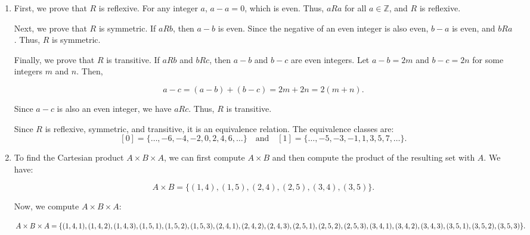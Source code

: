 \begin{enumerate}
\item
First, we prove that $R$ is reflexive. For any integer $a$, $a - a = 0$, which is even. Thus, $aRa$ for all $a \in \mathbb{Z}$, and $R$ is reflexive.

Next, we prove that $R$ is symmetric. If $aRb$, then $a - b$ is even. Since the negative of an even integer is also even, $b - a$ is even, and $bRa$. Thus, $R$ is symmetric.


Finally, we prove that $R$ is transitive. If $aRb$ and $bRc$, then $a - b$ and $b - c$ are even integers. Let $a - b = 2m$ and $b - c = 2n$ for some integers $m$ and $n$. Then,

\[
a - c = (a - b) + (b - c) = 2m + 2n = 2(m + n).
\]

Since $a - c$ is also an even integer, we have $aRc$. Thus, $R$ is transitive.

Since $R$ is reflexive, symmetric, and transitive, it is an equivalence relation. The equivalence classes are:
\[
[0] = \{\dots, -6, -4, -2, 0, 2, 4, 6, \dots\} \quad \text{and} \quad [1] = \{\dots, -5, -3, -1, 1, 3, 5, 7, \dots\}.
\]

\item
To find the Cartesian product $A \times B \times A$, we can first compute $A \times B$ and then compute the product of the resulting set with $A$. We have:

\[
A \times B = \{(1, 4), (1, 5), (2, 4), (2, 5), (3, 4), (3, 5)\}.
\]

Now, we compute $A \times B \times A$:

\[
A \times B \times A = \{(1, 4, 1), (1, 4, 2), (1, 4, 3), (1, 5, 1), (1, 5, 2), (1, 5, 3), \\
(2, 4, 1), (2, 4, 2), (2, 4, 3), (2, 5, 1), (2, 5, 2), (2, 5, 3), \\
(3, 4, 1), (3, 4, 2), (3, 4, 3), (3, 5, 1), (3, 5, 2), (3, 5, 3)\}.
\]
\end{enumerate}

